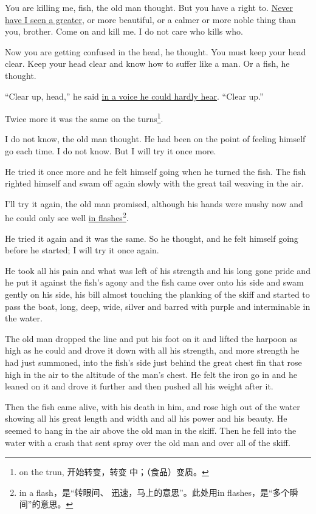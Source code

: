 You are killing me, fish, the old man thought. But you have a right to.
\uline{Never have I seen a greater}, or more beautiful, or a calmer or more noble
thing than you, brother. Come on and kill me. I do not care who kills who.

Now you are getting \gls{confused} in the head, he thought. You must keep your
head clear. Keep your head clear and know how to \gls{suffer} like a man. Or a
fish, he thought.

``Clear up, head,'' he said \uline{in a voice he could hardly hear}. ``Clear up.''

Twice more it was the same on the turns\footnote{on the trun, 开始转变，转变
  中；（食品）变质。}.

I do not know, the old man thought. He had been on the point of feeling
himself go each time. I do not know. But I will try it once more.

He tried it once more and he felt himself going when he turned the fish. The
fish righted himself and swam off again slowly with the great tail weaving
in the air.

I'll try it again, the old man promised, although his hands were \gls{mushy}
now and he could only see well \uline{in flashes}\footnote{in a flash，是“转眼间、
  迅速，马上的意思”。此处用in flashes，是“多个瞬间”的意思。}.

He tried it again and it was the same. So he thought, and he felt himself
going before he started; I will try it once again.

He took all his pain and what was left of his strength and his long gone
pride and he put it against the fish's \gls{agony} and the fish came over
onto his side and swam gently on his side, his bill almost touching the
planking of the skiff and started to pass the boat, long, deep, wide, silver
and \gls{barred} with purple and \gls{interminable} in the water.

The old man dropped the line and put his foot on it and lifted the harpoon
as high as he could and drove it down with all his strength, and more
strength he had just \gls{summoned}, into the fish's side just behind the
great \gls{chest} fin that rose high in the air to the \gls{altitude} of the
man's chest. He felt the \gls{iron} go in and he leaned on it and drove it
further and then pushed all his weight after it.

Then the fish came alive, with his death in him, and rose high out of the
water showing all his great length and width and all his power and his
beauty. He seemed to \gls{hang} in the air above the old man in the skiff.
Then he fell into the water with a crash that sent \gls{spray} over the old
man and over all of the skiff.

